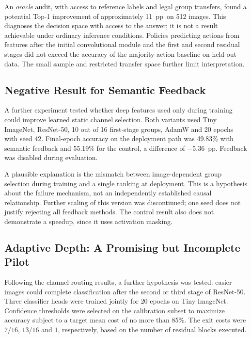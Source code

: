 \documentclass[12pt,a4paper]{article}
\newcommand{\pp}{pp}
\begin{document}
An \emph{oracle} audit, with access to reference labels and legal group
transfers, found a potential Top-1 improvement of approximately 11~\pp\
on 512 images. This diagnoses the decision space with access to the answer;
it is not a result achievable under ordinary inference conditions.
Policies predicting actions from features after the initial convolutional
module and the first and second residual stages did not exceed the accuracy
of the majority-action baseline on held-out data.
The small sample and restricted transfer space further limit interpretation.

\subsection{Negative Result for Semantic Feedback}

A further experiment tested whether deep features used only during training
could improve learned static channel selection.
Both variants used Tiny ImageNet, ResNet-50, 10 out of 16 first-stage groups,
AdamW and 20 epochs with seed 42.
Final-epoch accuracy on the deployment path was 49.83\% with semantic
feedback and 55.19\% for the control, a difference of $-5.36$~\pp.
Feedback was disabled during evaluation.

A plausible explanation is the mismatch between image-dependent group
selection during training and a single ranking at deployment.
This is a hypothesis about the failure mechanism, not an independently
established causal relationship. Further scaling of this version was
discontinued; one seed does not justify rejecting all feedback methods.
The control result also does not demonstrate a speedup, since it uses
activation masking.

\subsection{Adaptive Depth: A Promising but Incomplete Pilot}

Following the channel-routing results, a further hypothesis was tested:
easier images could complete classification after the second or third
stage of ResNet-50. Three classifier heads were trained jointly for
20 epochs on Tiny ImageNet.
Confidence thresholds were selected on the calibration subset to maximize
accuracy subject to a target mean cost of no more than 85\%.
The exit costs were $7/16$, $13/16$ and $1$, respectively,
based on the number of residual blocks executed.
\end{document}
